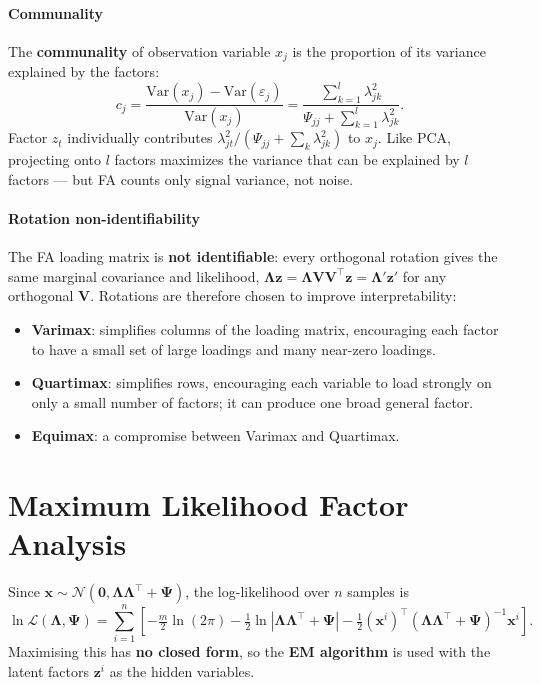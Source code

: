 \documentclass[11pt, oneside]{book}
\newcommand{\T}{^{\top}}
\begin{document}
\paragraph{Communality}
The \textbf{communality} of observation variable $x_j$ is the proportion of its
variance explained by the factors:
\[
  c_j = \frac{\mathrm{Var}(x_j) - \mathrm{Var}(\varepsilon_j)}{\mathrm{Var}(x_j)}
      = \frac{\sum_{k=1}^l \lambda_{jk}^2}{\Psi_{jj} + \sum_{k=1}^l \lambda_{jk}^2}.
\]
Factor $z_t$ individually contributes $\lambda_{jt}^2 / (\Psi_{jj} + \sum_k \lambda_{jk}^2)$
to $x_j$.
Like PCA, projecting onto $l$ factors maximizes the variance that can be explained by $l$
factors --- but FA counts only signal variance, not noise.

\paragraph{Rotation non-identifiability}
The FA loading matrix is \textbf{not identifiable}: every orthogonal rotation gives
the same marginal covariance and likelihood,
$\bm{\Lambda}\bm{z} = \bm{\Lambda}\bm{V}\bm{V}\T\bm{z} = \bm{\Lambda}'\bm{z}'$
for any orthogonal $\bm{V}$.
Rotations are therefore chosen to improve interpretability:
\begin{itemize}
  \item \textbf{Varimax}: simplifies columns of the loading matrix, encouraging each
        factor to have a small set of large loadings and many near-zero loadings.
  \item \textbf{Quartimax}: simplifies rows, encouraging each variable to load strongly
        on only a small number of factors; it can produce one broad general factor.
  \item \textbf{Equimax}: a compromise between Varimax and Quartimax.
\end{itemize}


\section{Maximum Likelihood Factor Analysis}

Since $\bm{x} \sim \mathcal{N}(\bm{0},\bm{\Lambda}\bm{\Lambda}\T+\bm{\Psi})$,
the log-likelihood over $n$ samples is
\[
  \ln\mathcal{L}(\bm{\Lambda},\bm{\Psi}) =
  \sum_{i=1}^n \left[
    -\tfrac{m}{2}\ln(2\pi)
    -\tfrac{1}{2}\ln|\bm{\Lambda}\bm{\Lambda}\T+\bm{\Psi}|
    -\tfrac{1}{2}(\bm{x}^i)\T(\bm{\Lambda}\bm{\Lambda}\T+\bm{\Psi})^{-1}\bm{x}^i
  \right].
\]
Maximising this has \textbf{no closed form}, so the \textbf{EM algorithm} is used with
the latent factors $\bm{z}^i$ as the hidden variables.
\end{document}
